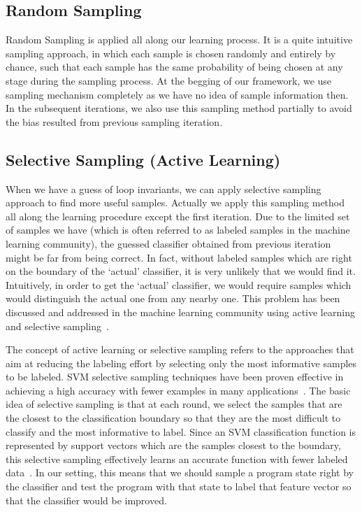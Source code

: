 \subsection{Random Sampling}
Random Sampling is applied all along our learning process.
It is a quite intuitive sampling approach, in which each sample is chosen randomly and entirely by chance, 
such that each sample has the same probability of being chosen at any stage during the sampling process.
At the begging of our framework, we use sampling mechanism completely as we have no idea of sample information then. 
In the subsequent iterations, we also use this sampling method partially to avoid the bias resulted from previous sampling iteration.


\subsection{Selective Sampling (Active Learning)}
When we have a guess of loop invariants, we can apply selective sampling approach to find more useful samples.
Actually we apply this sampling method all along the learning procedure except the first iteration.
Due to the limited set of samples we have (which is often referred to as labeled samples in the machine learning community), 
the guessed classifier obtained from previous iteration might be far from being correct. 
In fact, without labeled samples which are right on the boundary of the `actual' classifier, 
it is very unlikely that we would find it. 
Intuitively, in order to get the `actual' classifier, we would require samples which would distinguish the actual one from any nearby one. 
This problem has been discussed and addressed in the machine learning community using active learning and selective sampling~\cite{DBLP:conf/icml/SchohnC00}.

The concept of active learning or selective sampling refers to the approaches 
that aim at reducing the labeling effort by selecting only the most informative samples to be labeled. 
SVM selective sampling techniques have been proven effective in achieving a high accuracy 
with fewer examples in many applications~\cite{DBLP:conf/mm/TongC01,DBLP:journals/jmlr/TongK01}. 
The basic idea of selective sampling is that at each round, 
we select the samples that are the closest to the classification boundary so that they are the most difficult to classify and the most informative to label. 
Since an SVM classification function is represented by support vectors which are the samples closest to the boundary, 
this selective sampling effectively learns an accurate function with fewer labeled data~\cite{DBLP:conf/icml/SchohnC00}. 
In our setting, this means that we should sample a program state right by the classifier and test the program 
with that state to label that feature vector so that the classifier would be improved.

